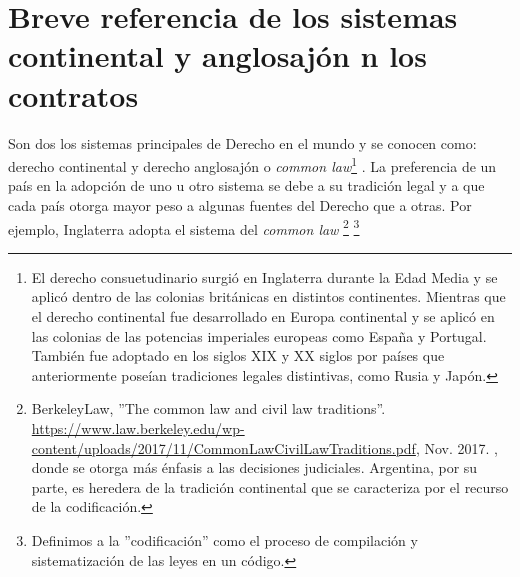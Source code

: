 \documentclass[12pt]{report} %
\begin{document}
\section{Breve referencia de los sistemas continental y anglosajón n los
contratos}


Son dos los sistemas principales de Derecho en el mundo y se conocen como: derecho continental y derecho anglosajón o \textit{common law}\footnote{El derecho consuetudinario surgió en Inglaterra durante la Edad Media y se aplicó dentro de las colonias británicas en distintos continentes. Mientras que el derecho continental fue desarrollado en Europa continental y se aplicó en las colonias de las potencias imperiales europeas como España y Portugal. También fue adoptado en los siglos XIX y XX siglos por países que anteriormente poseían tradiciones legales distintivas, como Rusia y Japón.} . La preferencia de un país en la adopción de uno u otro sistema se debe a su tradición legal y a que cada país otorga mayor peso a algunas fuentes del Derecho que a otras. Por ejemplo, Inglaterra adopta el sistema del \textit{common law} \footnote{BerkeleyLaw, ''The common law and civil law traditions''. 
\url{https://www.law.berkeley.edu/wp-content/uploads/2017/11/CommonLawCivilLawTraditions.pdf}, Nov. 2017.
, donde se otorga más énfasis a las decisiones  judiciales. Argentina, por su parte, es heredera de la tradición continental que se caracteriza por el recurso de la codificación.} 
\footnote{Definimos a la ''codificación'' como el proceso de compilación y sistematización de las leyes en un código.}
\end{document}

